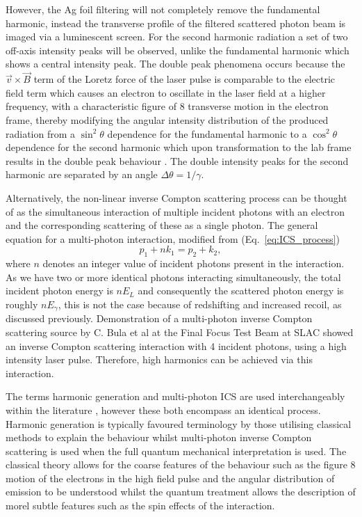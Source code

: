 \documentclass[../main.tex]{subfiles}
\begin{document}
However, the Ag foil filtering will not completely remove the fundamental harmonic, instead the transverse profile of the filtered scattered photon beam is imaged via a luminescent screen. For the second harmonic radiation a set of two off-axis intensity peaks will be observed, unlike the fundamental harmonic which shows a central intensity peak. The double peak phenomena occurs because the $\overrightarrow{v}\times\overrightarrow{B}$ term of the Loretz force of the laser pulse is comparable to the electric field term which causes an electron to oscillate in the laser field at a higher frequency, with a characteristic figure of 8 transverse motion \cite{sarachik1970classical,jackson1999classical} in the electron frame, thereby modifying the angular intensity distribution of the produced radiation from a $\sin^{2}\theta$ dependence for the fundamental harmonic to a $\cos^{2}\theta$ dependence for the second harmonic which upon transformation to the lab frame results in the double peak behaviour \cite{babzien2006observation}. The double intensity peaks for the second harmonic are separated by an angle $\Delta\theta = 1/\gamma$.   

Alternatively, the non-linear inverse Compton scattering process can be thought of as the simultaneous interaction of multiple incident photons with an electron and the corresponding scattering of these as a single photon. The general equation for a multi-photon interaction, modified from (Eq.~\ref{eq:ICS_process}) \cite{bula1996observation,seipt2011nonlinear}
\begin{equation}
p_{1} + \mathit{n}k_{1} = p_{2} + k_{2},
\label{eq:nonlinear_electron_photon_interaction}    
\end{equation}
where $n$ denotes an integer value of incident photons present in the interaction. As we have two or more identical photons interacting simultaneously, the total incident photon energy is $n E_{L}$ and consequently the scattered photon energy is roughly $nE_{\gamma}$, this is not the case because of redshifting and increased recoil, as discussed previously. Demonstration of a multi-photon inverse Compton scattering source by C. Bula et al \cite{bula1996observation} at the Final Focus Test Beam at SLAC \cite{burke1994results} showed an inverse Compton scattering  interaction with 4 incident photons, using a high intensity laser pulse. Therefore, high harmonics can be achieved via this interaction. 

The terms harmonic generation and multi-photon ICS are used interchangeably within the literature \cite{}, however these both encompass an identical process. Harmonic generation is typically favoured terminology by those utilising classical methods to explain the behaviour whilst multi-photon inverse Compton scattering is used when the full quantum mechanical interpretation is used. The classical theory \cite{sarachik1970classical} allows for the coarse features of the behaviour such as the figure 8 motion of the electrons in the high field pulse and the angular distribution of emission to be understood whilst the quantum treatment \cite{brown1964interaction,kibble1965frequency} allows the description of morel subtle features such as the spin effects of the interaction.    
\end{document}
